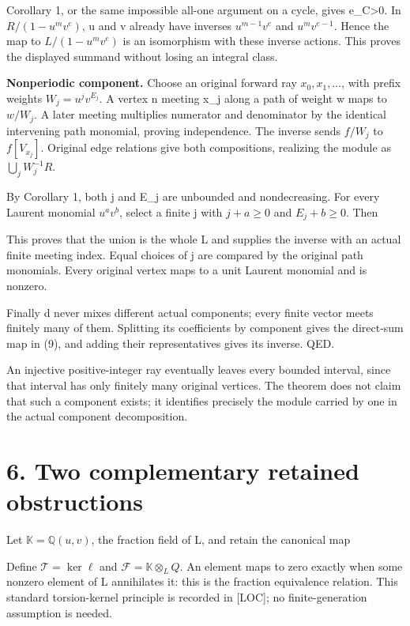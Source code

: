 Corollary 1, or the same impossible all-one argument on a cycle, gives
e\_C\textgreater0. In \(R/(1-u^m v^e)\), u and v already have inverses
\(u^{m-1}v^e\) and \(u^m v^{e-1}\). Hence the map to \(L/(1-u^m v^e)\)
is an isomorphism with these inverse actions. This proves the displayed
summand without losing an integral class.

\textbf{Nonperiodic component.} Choose an original forward ray
\(x_0,x_1,\ldots\), with prefix weights \(W_j=u^jv^{E_j}\). A vertex n
meeting x\_j along a path of weight w maps to \(w/W_j\). A later meeting
multiplies numerator and denominator by the identical intervening path
monomial, proving independence. The inverse sends \(f/W_j\) to
\(f[V_{x_j}]\). Original edge relations give both compositions,
realizing the module as \(\bigcup_j W_j^{-1}R\).

By Corollary 1, both j and E\_j are unbounded and nondecreasing. For
every Laurent monomial \(u^a v^b\), select a finite j with \(j+a\ge0\)
and \(E_j+b\ge0\). Then


This proves that the union is the whole L and supplies the inverse with
an actual finite meeting index. Equal choices of j are compared by the
original path monomials. Every original vertex maps to a unit Laurent
monomial and is nonzero.

Finally d never mixes different actual components; every finite vector
meets finitely many of them. Splitting its coefficients by component
gives the direct-sum map in (9), and adding their representatives gives
its inverse. QED.

An injective positive-integer ray eventually leaves every bounded
interval, since that interval has only finitely many original vertices.
The theorem does not claim that such a component exists; it identifies
precisely the module carried by one in the actual component
decomposition.

\section{6. Two complementary retained obstructions}

Let \(\mathbb K=\mathbb Q(u,v)\), the fraction field of L, and retain
the canonical map


Define \(\mathcal T=\ker\ell\) and \(\mathcal F=\mathbb K\otimes_LQ\).
An element maps to zero exactly when some nonzero element of L
annihilates it: this is the fraction equivalence relation. This standard
torsion-kernel principle is recorded in {[}LOC{]}; no finite-generation
assumption is needed.

